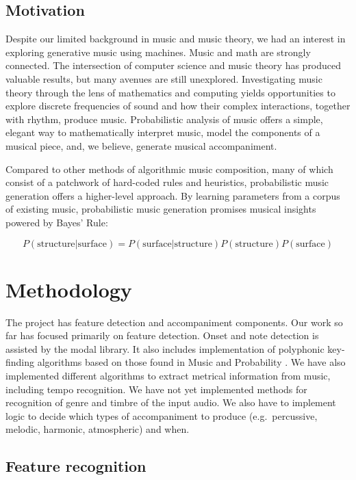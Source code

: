\documentclass[11pt,conference,letterpaper]{IEEEtran}
\begin{document}

\subsection{Motivation}

Despite our limited background in music and music theory, we had an interest in exploring generative music using machines. Music and math are strongly connected. The intersection of computer science and music theory has produced valuable results, but many avenues are still unexplored. Investigating music theory through the lens of mathematics and computing yields opportunities to explore discrete frequencies of sound and how their complex interactions, together with rhythm, produce music. Probabilistic analysis of music offers a simple, elegant way to mathematically interpret music, model the components of a musical piece, and, we believe, generate musical accompaniment.

Compared to other methods of algorithmic music composition, many of which consist of a patchwork of hard-coded rules and heuristics, probabilistic music generation offers a higher-level approach. By learning parameters from a corpus of existing music, probabilistic music generation promises musical insights powered by Bayes' Rule:

{\small
\[ P(\text{structure}|\text{surface}) = P(\text{surface}|\text{structure})P(\text{structure})P(\text{surface}) \]
}

\section{Methodology}

The project has feature detection and accompaniment components. Our work so far has focused primarily on feature detection. Onset and note detection is assisted by the modal library. It also includes implementation of polyphonic key-finding algorithms based on those found in Music and Probability \cite{temperly2007mprob}. We have also implemented different algorithms to extract metrical information from music, including tempo recognition. We have not yet implemented methods for recognition of genre and timbre of the input audio. We also have to implement logic to decide which types of accompaniment to produce (e.g.\ percussive, melodic, harmonic, atmospheric) and when.

\subsection{Feature recognition}
\end{document}
